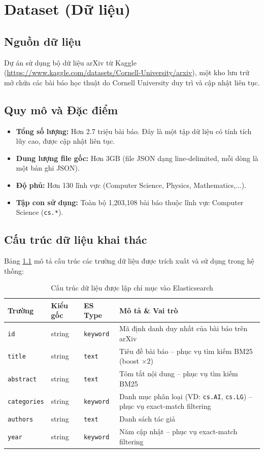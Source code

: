 \chapter{Dataset (Dữ liệu)}

\section{Nguồn dữ liệu}
Dự án sử dụng bộ dữ liệu arXiv từ Kaggle \cite{arxiv_dataset} (\url{https://www.kaggle.com/datasets/Cornell-University/arxiv}), một kho lưu trữ mở chứa các bài báo học thuật do Cornell University duy trì và cập nhật liên tục.

\section{Quy mô và Đặc điểm}
\begin{itemize}
    \item \textbf{Tổng số lượng:} Hơn 2.7 triệu bài báo. Đây là một tập dữ liệu có tính tích lũy cao, được cập nhật liên tục.
    \item \textbf{Dung lượng file gốc:} Hơn 3GB (file JSON dạng line-delimited, mỗi dòng là một bản ghi JSON).
    \item \textbf{Độ phủ:} Hơn 130 lĩnh vực (Computer Science, Physics, Mathematics,...).
    \item \textbf{Tập con sử dụng:} Toàn bộ 1,203,108 bài báo thuộc lĩnh vực Computer Science (\texttt{cs.*}).
\end{itemize}

\section{Cấu trúc dữ liệu khai thác}
Bảng \ref{tab:data-schema} mô tả cấu trúc các trường dữ liệu được trích xuất và sử dụng trong hệ thống:

\begin{table}[H]
\centering
\begin{tabular}{|l|l|l|p{6cm}|}
\hline
\textbf{Trường} & \textbf{Kiểu gốc} & \textbf{ES Type} & \textbf{Mô tả \& Vai trò} \\ \hline
\texttt{id} & string & \texttt{keyword} & Mã định danh duy nhất của bài báo trên arXiv \\ \hline
\texttt{title} & string & \texttt{text} & Tiêu đề bài báo -- phục vụ tìm kiếm BM25 (boost $\times 2$) \\ \hline
\texttt{abstract} & string & \texttt{text} & Tóm tắt nội dung -- phục vụ tìm kiếm BM25 \\ \hline
\texttt{categories} & string & \texttt{keyword} & Danh mục phân loại (VD: \texttt{cs.AI}, \texttt{cs.LG}) -- phục vụ exact-match filtering \\ \hline
\texttt{authors} & string & \texttt{text} & Danh sách tác giả \\ \hline
\texttt{year} & string & \texttt{keyword} & Năm cập nhật -- phục vụ exact-match filtering \\ \hline
\end{tabular}
\caption{Cấu trúc dữ liệu được lập chỉ mục vào Elasticsearch}
\label{tab:data-schema}
\end{table}

